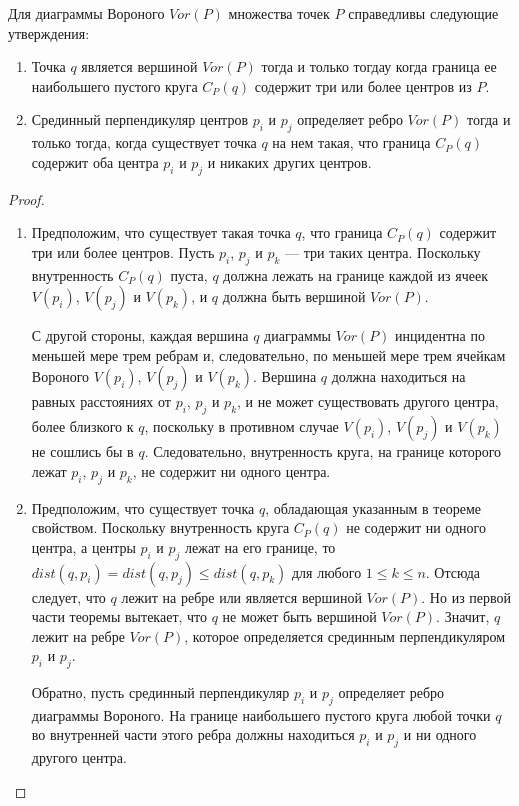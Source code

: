 \begin{theorem}
	Для  диаграммы  Вороного  $Vor(P)$  множества  точек  $P$  справедливы следующие  утверждения:
	
	\begin{enumerate}
		\item Точка  $q$  является  вершиной  $Vor(P)$  тогда  и  только  тогдау  когда  граница  ее наибольшего  пустого  круга  $C_P(q)$  содержит  три  или  более  центров  из  $P$.
		\item Срединный  перпендикуляр  центров  $p_i$  и  $p_j$  определяет  ребро  $Vor(P)$  тогда  и только  тогда,  когда  существует  точка  $q$  на  нем  такая,  что  граница  $C_P(q)$ содержит  оба  центра  $p_i$  и  $p_j$  и  никаких  других  центров.
	\end{enumerate}
\end{theorem}

\begin{proof}
	\begin{enumerate}
		\item Предположим,  что  существует  такая  точка  $q$,  что  граница $C_P(q)$  содержит  три  или  более  центров.
		Пусть  $p_i$,  $p_j$  и  $p_k$ ---  три  таких  центра.
		Поскольку  внутренность  $C_P(q)$  пуста,  $q$  должна  лежать  на  границе  каждой  из  ячеек  $V(p_i)$,  $V(p_j)$  и  $V(p_k)$,  и  $q$  должна  быть  вершиной  $Vor(P)$.
		
		С  другой  стороны,  каждая  вершина  $q$  диаграммы $Vor(P)$  инцидентна  по  меньшей  мере  трем  ребрам  и,  следовательно,  по  меньшей  мере  трем  ячейкам  Вороного $V(p_i)$,  $V(p_j)$  и  $V(p_k)$. 
		Вершина  $q$  должна  находиться  на  равных  расстояниях  от  $p_i$,  $p_j$  и  $p_k$,  и  не  может  существовать другого  центра,  более  близкого  к  $q$,  поскольку  в  противном  случае  $V(p_i)$,  $V(p_j)$  и  $V(p_k)$  не  сошлись  бы  в  $q$.
		Следовательно,  внутренность  круга,  на  границе  которого  лежат $p_i$,  $p_j$  и  $p_k$,  не  содержит  ни  одного  центра.
		
		\item Предположим,  что  существует  точка  $q$,  обладающая  указанным  в  теореме свойством.
		Поскольку  внутренность  круга  $C_P(q)$  не  содержит  ни  одного  центра,  а центры  $p_i$  и  $p_j$  лежат  на  его  границе,  то  $dist(q, p_i)  =  dist(q, p_j) \le dist(q,  p_k)$  для  любого $1 \le k \le n$.
		Отсюда  следует,  что  $q$  лежит  на  ребре  или  является  вершиной  $Vor(P)$.
		Но из  первой  части  теоремы  вытекает,  что  $q$  не  может  быть  вершиной  $Vor(P)$.
		Значит,  $q$ лежит  на  ребре  $Vor(P)$,  которое  определяется  срединным  перпендикуляром $p_i$ и $p_j$.
		
		Обратно,  пусть  срединный  перпендикуляр  $p_i$ и $p_j$ определяет  ребро  диаграммы Вороного.
		На  границе  наибольшего  пустого  круга  любой  точки  $q$  во  внутренней части  этого  ребра  должны  находиться $p_i$ и $p_j$ и  ни  одного  другого  центра.
	\end{enumerate}
\end{proof}

